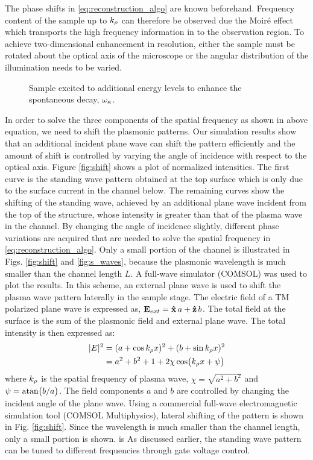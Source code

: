 %
The phase shifts in \eqref{eq:reconstruction_algo} are known beforehand. Frequency content of the sample up to $k_{\rho}$ can therefore be observed due the Moiré effect which transports the high frequency information in to the observation region. To achieve two-dimensional enhancement in resolution, either the sample must be rotated about the optical axis of the microscope or the angular distribution of the illumination needs to be varied.
%
\begin{figure}[b!]
  \centering
  \def\svgwidth{.5\linewidth}
  
  \caption{Sample excited to additional energy levels to enhance the spontaneous decay, $\omega_{\kappa}$.}
  \label{fig:e_diag}
\end{figure}
%
In order to solve the three components of the spatial frequency as shown in above equation, we need to shift the plasmonic patterns. Our simulation results show that an additional incident plane wave can shift the pattern efficiently and the amount of shift is controlled by varying the angle of incidence with respect to the optical axis. Figure \ref{fig:shift} shows a plot of normalized intensities. The first curve is the standing wave pattern obtained at the top surface which is only due to the surface current in the channel below. The remaining curves show the shifting of the standing wave, achieved by an additional plane wave incident from the top of the structure, whose intensity is greater than that of the plasma wave in the channel. By changing the angle of incidence slightly, different phase variations are acquired that are needed to solve the spatial frequency in \eqref{eq:reconstruction_algo}. Only a small portion of the channel is illustrated in Figs. \ref{fig:shift} and
\ref{fig:s_waves}, because the plasmonic wavelength is much smaller than the channel length $L$. A full-wave simulator (COMSOL) was used to plot the results.
%
In this scheme, an external plane wave is used to shift the plasma wave pattern laterally in the sample stage. The electric field of a TM polarized plane wave is expressed as, $\mathbf{E}_{ext} = \mathbf{\hat x} \, a  +  \mathbf{\hat z} \, b $. The total field at the surface is the sum of the plasmonic field and external plane wave. The total intensity is then expressed as:
%
\begin{equation}
  \begin{split}
    \vert E \vert^2 &= (a + \cos k_{\rho}x)^2 + (b + \sin k_{\rho}x)^2 \\
    &=  a^2 + b^2 + 1 + 2 \chi \cos(k_{\rho}x + \psi)
  \end{split}
  \label{eq:shift}
\end{equation}
%
where $k_{\rho}$ is the spatial frequency of plasma wave, $\chi = \sqrt{a^2 + b^2}$ and $\psi = \atan (b/a)$. The field components $a$ and $b$ are controlled by changing the incident angle of the plane wave. Using a commercial full-wave electromagnetic simulation tool (COMSOL Multiphysics), lateral shifting of the pattern is shown in Fig. \ref{fig:shift}. Since the wavelength is much smaller than the channel length, only a small portion is shown.  is As discussed earlier, the standing wave pattern can be tuned to different frequencies through gate voltage control.


